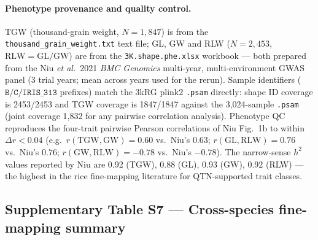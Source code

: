 \paragraph{Phenotype provenance and quality control.}
TGW (thousand-grain weight, $N{=}1{,}847$) is from the
\texttt{thousand\_grain\_weight.txt} text file; GL, GW and RLW
($N{=}2{,}453$, $\mathrm{RLW}=\mathrm{GL/GW}$) are from the
\texttt{3K.shape.phe.xlsx} workbook --- both prepared from the
Niu \emph{et al.}\ 2021 \emph{BMC Genomics} \cite{niu2021grain}
multi-year, multi-environment GWAS panel (3 trial years; mean
across years used for the rerun). Sample identifiers
($\mathtt{B}/\mathtt{C}/\mathtt{IRIS\_313}$ prefixes) match the
3kRG plink2 \texttt{.psam} directly: shape ID coverage is 2453/2453
and TGW coverage is 1847/1847 against the 3{,}024-sample \texttt{.psam}
(joint coverage 1{,}832 for any pairwise correlation analysis).
Phenotype QC reproduces the four-trait pairwise Pearson
correlations of Niu Fig.~1b to within $\Delta r{<}0.04$ (e.g.\
$r(\mathrm{TGW},\mathrm{GW}){=}0.60$ vs.\ Niu's $0.63$;
$r(\mathrm{GL},\mathrm{RLW}){=}0.76$ vs.\ Niu's $0.76$;
$r(\mathrm{GW},\mathrm{RLW}){=}-0.78$ vs.\ Niu's $-0.78$). The
narrow-sense $h^2$ values reported by Niu are 0.92 (TGW), 0.88
(GL), 0.93 (GW), 0.92 (RLW) --- the highest in the rice
fine-mapping literature for QTN-supported trait classes.

\clearpage

\subsection*{Supplementary Table S7 --- Cross-species fine-mapping summary}

